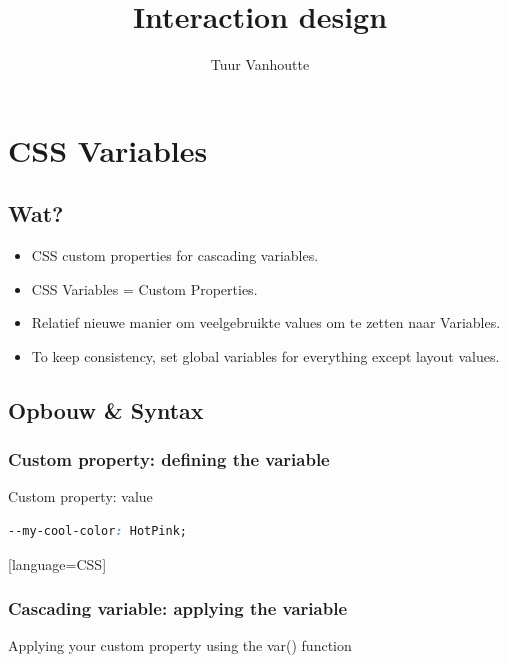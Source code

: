 \documentclass{article}
\begin{document}
\begin{titlepage}
    \author{Tuur Vanhoutte}
    \title{Interaction design}
\end{titlepage}

\maketitle
\newpage
\tableofcontents
\newpage


\section{CSS Variables}

\subsection{Wat?}

\begin{itemize}
    \item CSS custom properties for cascading variables.
    \item CSS Variables = Custom Properties.
    \item Relatief nieuwe manier om veelgebruikte values om te zetten naar Variables.
    \item To keep consistency, set global variables for everything except layout values.
\end{itemize}

\subsection{Opbouw \& Syntax}

\subsubsection{Custom property: defining the variable}
Custom property: value

\begin{lstlisting}[language=CSS]
--my-cool-color: HotPink;
\end{lstlisting}[language=CSS]

\subsubsection{Cascading variable: applying the variable}

Applying your custom property using the var() function
\end{document}
